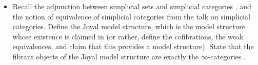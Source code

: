 \documentclass{amsart}
\theoremstyle{definition}
\theoremstyle{remark}
\newcommand{\Cpl}{\mathop{\mathbf{Cpl}}\nolimits}
\newcommand{\Mod}{\rm Mod}
\newcommand{\sSet}{\mathrm{sSet}}
\begin{document}
\begin{itemize}
\item Recall the adjunction between simplicial sets and simplicial categories \cite[Def. 1.1.5.5]{HTT}, and the notion of equivalence of simplicial categories \cite[Def. 1.1.4.4, Def. 1.1.3.6]{HTT} from the talk on simplicial categories. Define the Joyal model structure, which is the model structure whose existence is claimed in \cite[Thm. 2.2.5.1]{HTT} (or rather, define the cofibrations, the weak equivalences, and claim that this provides a model structure). State that the fibrant objects of the Joyal model structure are exactly the $\infty$-categories \cite[Thm. 2.4.6.1]{HTT}.
  


\end{itemize}
\end{document}
